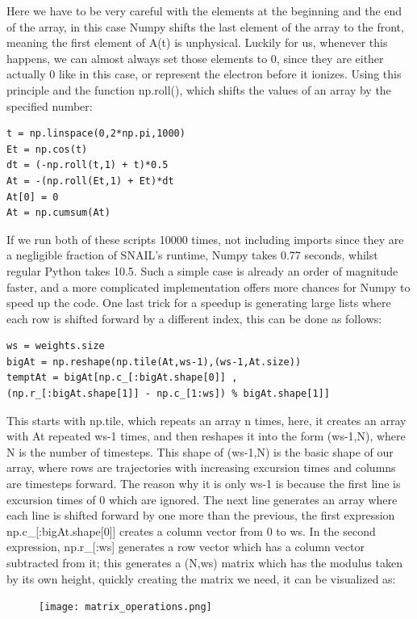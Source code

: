 \documentclass[11pt,a4paper]{report}
\begin{document}
Here we have to be very careful with the elements at the beginning and the end of the array, in this case Numpy shifts the last element of the array to the front, meaning the first element of A(t) is unphysical. Luckily for us, whenever this happens, we can almost always set those elements to 0, since they are either actually 0 like in this case, or represent the electron before it ionizes. Using this principle and the function np.roll(), which shifts the values of an array by the specified number:
\begin{verbatim}
t = np.linspace(0,2*np.pi,1000)
Et = np.cos(t)
dt = (-np.roll(t,1) + t)*0.5
At = -(np.roll(Et,1) + Et)*dt 
At[0] = 0
At = np.cumsum(At)
\end{verbatim}
If we run both of these scripts 10000 times, not including imports since they are a negligible fraction of SNAIL's runtime, Numpy takes 0.77 seconds, whilst regular Python takes 10.5. Such a simple case is already an order of magnitude faster, and a more complicated implementation offers more chances for Numpy to speed up the code. One last trick for a speedup is generating large lists where each row is shifted forward by a different index, this can be done as follows:

\begin{verbatim}
ws = weights.size
bigAt = np.reshape(np.tile(At,ws-1),(ws-1,At.size))
temptAt = bigAt[np.c_[:bigAt.shape[0]] , 
(np.r_[:bigAt.shape[1]] - np.c_[1:ws]) % bigAt.shape[1]]
\end{verbatim}
This starts with np.tile, which repeats an array n times, here, it creates an array with At repeated ws-1 times, and then reshapes it into the form (ws-1,N), where N is the number of timesteps. This shape of (ws-1,N) is the basic shape of our array, where rows are trajectories with increasing excursion times and columns are timesteps forward. The reason why it is only ws-1 is because the first line is excursion times of 0 which are ignored. The next line generates an array where each line is shifted forward by one more than the previous, the first expression np.c\_[:bigAt.shape[0]] creates a column vector from 0 to ws. In the second expression, np.r\_[:ws] generates a row vector which has a column vector subtracted from it; this generates a (N,ws) matrix which has the modulus taken by its own height, quickly creating the matrix we need, it can be visualized as:

\begin{figure}[h]
\centering
\texttt{[image: matrix\_operations.png]}
\end{figure}
\end{document}
